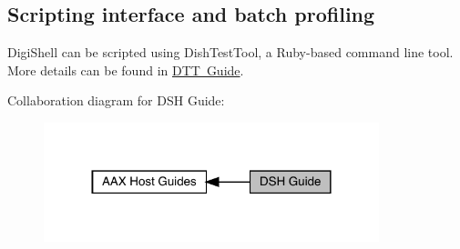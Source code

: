  \hypertarget{a00835_dsh_guide_04_scripting_interface_and_batch_profiling}{}\subsection{Scripting interface and batch profiling}\label{a00835_dsh_guide_04_scripting_interface_and_batch_profiling}
 Digi\+Shell can be scripted using Dish\+Test\+Tool, a Ruby-\/based command line tool. More details can be found in \mbox{\hyperlink{a00836}{D\+TT Guide}}.

 Collaboration diagram for D\+SH Guide\+:
\nopagebreak
\begin{figure}[H]
\begin{center}
\leavevmode
\includegraphics[width=276pt]{a00835}
\end{center}
\end{figure}
